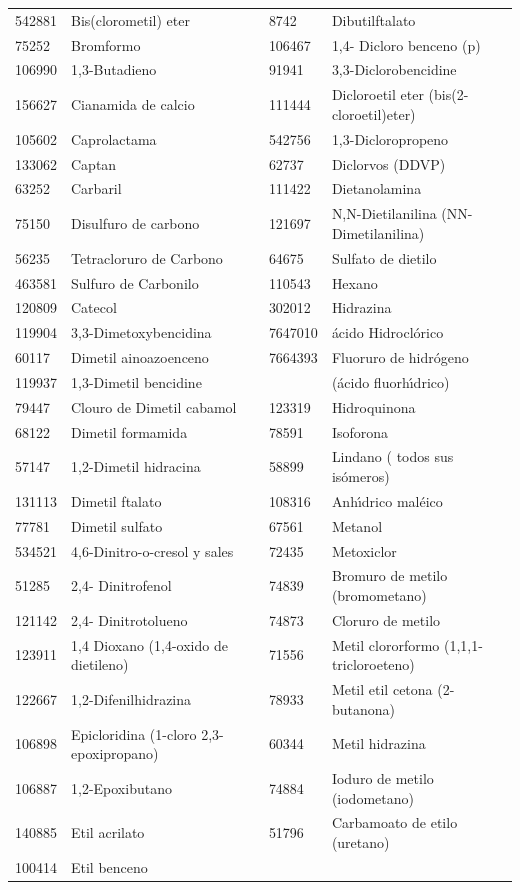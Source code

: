 \begin{table}[!htdp]
\begin{scriptsize}
\begin{supertabular}{| p{0.10\textwidth}p{0.35\textwidth}p{0.10\textwidth}p{0.35\textwidth} |}
542881& Bis(clorometil) eter &8742&Dibutilftalato\\
75252 & Bromformo &106467&1,4- Dicloro benceno (p) \\
106990 &1,3-Butadieno &91941& 3,3-Diclorobencidine \\
156627 & Cianamida de calcio &111444&Dicloroetil eter (bis(2-cloroetil)eter)\\
105602& Caprolactama& 542756 &1,3-Dicloropropeno\\ 
133062 & Captan & 62737 & Diclorvos (DDVP)\\
63252 & Carbaril &111422& Dietanolamina\\
75150 & Disulfuro de carbono & 121697 & N,N-Dietilanilina (NN-Dimetilanilina) \\
56235 & Tetracloruro de Carbono &64675&Sulfato de dietilo\\
463581 & Sulfuro de Carbonilo  &110543&Hexano\\
120809 & Catecol & 302012&Hidrazina \\
119904 & 3,3-Dimetoxybencidina &7647010&  \'acido Hidrocl\'orico\\
60117 & Dimetil ainoazoenceno&7664393& Fluoruro de hidr\'ogeno\\
119937 & 1,3-Dimetil bencidine & &(\'acido fluorh\'{\i}drico)\\
79447 & Clouro de Dimetil cabamol&123319&Hidroquinona\\
  68122 & Dimetil formamida &78591&Isoforona\\
  57147 & 1,2-Dimetil hidracina & 58899&Lindano ( todos sus is\'omeros) \\
  131113&  Dimetil ftalato &108316&Anh\'{\i}drico mal\'eico \\
  77781 &Dimetil sulfato &67561&Metanol \\
  534521& 4,6-Dinitro-o-cresol y sales & 72435&Metoxiclor \\
  51285 & 2,4- Dinitrofenol & 74839 & Bromuro de metilo (bromometano)\\
  121142 & 2,4- Dinitrotolueno & 74873& Cloruro de metilo \\
  123911 & 1,4 Dioxano (1,4-oxido de dietileno) &71556&Metil clororformo (1,1,1-tricloroeteno)\\
  122667 & 1,2-Difenilhidrazina &78933&Metil etil cetona (2-butanona) \\
  106898 & Epicloridina (1-cloro 2,3-epoxipropano)&60344 &Metil hidrazina\\
  106887 & 1,2-Epoxibutano &74884&Ioduro de metilo (iodometano)\\
  140885 & Etil acrilato &51796 &Carbamoato de etilo (uretano) \\
  100414 & Etil benceno &  &\\\hline
\end{supertabular}
\end{scriptsize}
\label{airtox}
\end{table}%


